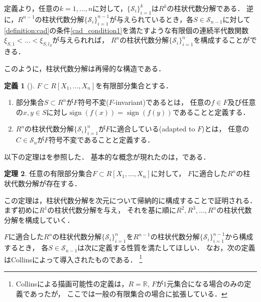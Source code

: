 \documentclass[uplatex, dvipdfmx]{jsarticle}
\numberwithin{equation}{section}
\newcommand{\R}{\mathbb{R}}
\DeclareMathOperator{\sign}{sign}
\theoremstyle{definition}
\newtheorem{definition}{定義}[section]
\newtheorem{theorem}[definition]{定理}
\begin{document}
定義より，任意の$k=1, \dots, n$に対して，$\{\mathcal{S}_i\}_{i=1}^k$は$R^k$の柱状代数分解である．
逆に，$R^{n-1}$の柱状代数分解$\{\mathcal{S}_i\}_{i=1}^{n-1}$が与えられているとき，各$S \in \mathcal{S}_{n-1}$に対して
\cref{definition:cad}の条件\ref{cad_condition1}を満たすような有限個の連続半代数関数$\xi_{S,1}<\dots<\xi_{S,l_S}$が与えられれば，
$R^n$の柱状代数分解$\{\mathcal{S}_i\}_{i=1}^n$を構成することができる．

このように，柱状代数分解は再帰的な構造である．

\begin{definition}[{\cite[Definition 5.5]{MR2248869}}]
     $F \subset R[X_1, \dots, X_n]$を有限部分集合とする．
     \begin{enumerate}
          \item 部分集合$S \subset R^n$が$F$符号不変($F$-invariant)であるとは，
          任意の$f \in F$及び任意の$x,y \in S$に対し$\sign(f(x))=\sign(f(y))$であることと定義する．

          \item $R^n$の柱状代数分解$\{\mathcal{S}_i\}_{i=1}^n$が$F$に適合している(adapted to $F$)とは，
          任意の$C \in \mathcal{S}_n$が$F$符号不変であることと定義する．
     \end{enumerate}
\end{definition}

以下の定理は\cite[Theorem 5.6]{MR2248869}を参照した．
基本的な概念が現れたのは，\cite{MR0403962}である．
\begin{theorem} \label{theorem:cad}
     任意の有限部分集合$F \subset R[X_1, \dots, X_n]$に対して，
     $F$に適合した$R^n$の柱状代数分解が存在する．
\end{theorem}

この定理は，柱状代数分解を次元について帰納的に構成することで証明される．
まず初めに$R^1$の柱状代数分解を与え，
それを基に順に$R^2, R^3, \dots, R^n$の柱状代数分解を構成していく．

$F$に適合した$R^n$の柱状代数分解$\{\mathcal{S}_i\}_{i=1}^n$を$R^{n-1}$の柱状代数分解$\{\mathcal{S}_i\}_{i=1}^{n-1}$から構成するとき，
各$S \in \mathcal{S}_{n-1}$は次に定義する性質を満たしてほしい．
なお，次の定義はCollins\cite{MR0403962}によって導入されたものである．
\footnote{
     Collins\cite{MR0403962}による描画可能性の定義は，$R=\R$, $F$が$1$元集合になる場合のみの定義であったが，
     ここでは一般の有限集合の場合に拡張している．
}
\end{document}

